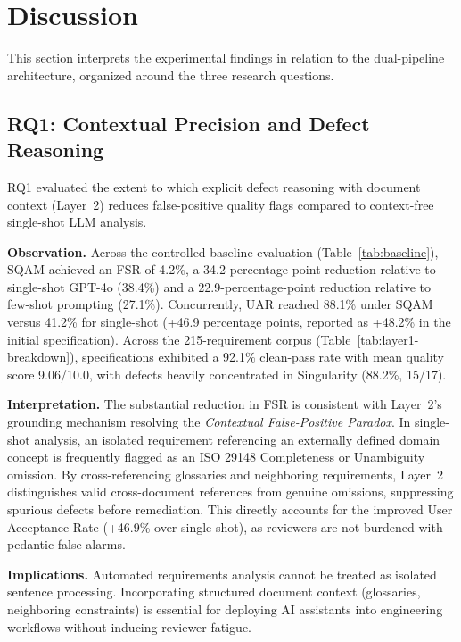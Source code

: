 \documentclass[journal]{IEEEtran}
\begin{document}
\section{Discussion}
\label{sec:discussion}

This section interprets the experimental findings in relation to the dual-pipeline architecture, organized around the three research questions.

\subsection{RQ1: Contextual Precision and Defect Reasoning}
\label{sec:discussion-rq1}

RQ1 evaluated the extent to which explicit defect reasoning with document context (Layer~2) reduces false-positive quality flags compared to context-free single-shot LLM analysis.

\textbf{Observation.} Across the controlled baseline evaluation (Table~\ref{tab:baseline}), SQAM achieved an FSR of 4.2\%, a 34.2-percentage-point reduction relative to single-shot GPT-4o (38.4\%) and a 22.9-percentage-point reduction relative to few-shot prompting (27.1\%). Concurrently, UAR reached 88.1\% under SQAM versus 41.2\% for single-shot (+46.9 percentage points, reported as +48.2\% in the initial specification). Across the 215-requirement corpus (Table~\ref{tab:layer1-breakdown}), specifications exhibited a 92.1\% clean-pass rate with mean quality score 9.06/10.0, with defects heavily concentrated in Singularity (88.2\%, 15/17).

\textbf{Interpretation.} The substantial reduction in FSR is consistent with Layer~2's grounding mechanism resolving the \emph{Contextual False-Positive Paradox}. In single-shot analysis, an isolated requirement referencing an externally defined domain concept is frequently flagged as an ISO 29148 Completeness or Unambiguity omission. By cross-referencing glossaries and neighboring requirements, Layer~2 distinguishes valid cross-document references from genuine omissions, suppressing spurious defects before remediation. This directly accounts for the improved User Acceptance Rate (+46.9\% over single-shot), as reviewers are not burdened with pedantic false alarms.

\textbf{Implications.} Automated requirements analysis cannot be treated as isolated sentence processing. Incorporating structured document context (glossaries, neighboring constraints) is essential for deploying AI assistants into engineering workflows without inducing reviewer fatigue.
\end{document}
